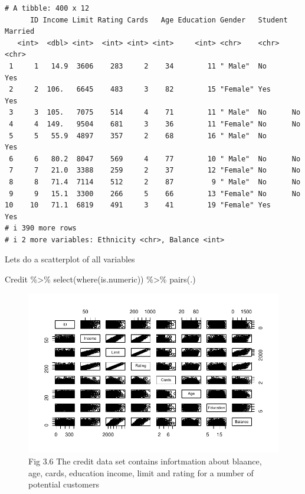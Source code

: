 \documentclass[
  letterpaper,
  DIV=11,
  numbers=noendperiod]{scrreprt}
\newenvironment{Shaded}{\begin{snugshade}}{\end{snugshade}}
\newcommand{\FunctionTok}[1]{\textcolor[rgb]{0.02,0.16,0.49}{#1}}
\newcommand{\NormalTok}[1]{\textcolor[rgb]{0.33,0.33,0.33}{#1}}
\newcommand{\SpecialCharTok}[1]{\textcolor[rgb]{0.00,0.46,0.62}{#1}}
\begin{document}
\begin{verbatim}
# A tibble: 400 x 12
      ID Income Limit Rating Cards   Age Education Gender   Student Married
   <int>  <dbl> <int>  <int> <int> <int>     <int> <chr>    <chr>   <chr>  
 1     1   14.9  3606    283     2    34        11 " Male"  No      Yes    
 2     2  106.   6645    483     3    82        15 "Female" Yes     Yes    
 3     3  105.   7075    514     4    71        11 " Male"  No      No     
 4     4  149.   9504    681     3    36        11 "Female" No      No     
 5     5   55.9  4897    357     2    68        16 " Male"  No      Yes    
 6     6   80.2  8047    569     4    77        10 " Male"  No      No     
 7     7   21.0  3388    259     2    37        12 "Female" No      No     
 8     8   71.4  7114    512     2    87         9 " Male"  No      No     
 9     9   15.1  3300    266     5    66        13 "Female" No      No     
10    10   71.1  6819    491     3    41        19 "Female" Yes     Yes    
# i 390 more rows
# i 2 more variables: Ethnicity <chr>, Balance <int>
\end{verbatim}

Lets do a scatterplot of all variables

\begin{Shaded}
\begin{Highlighting}[]
\NormalTok{Credit }\SpecialCharTok{\%\textgreater{}\%} \FunctionTok{select}\NormalTok{(}\FunctionTok{where}\NormalTok{(is.numeric)) }\SpecialCharTok{\%\textgreater{}\%} \FunctionTok{pairs}\NormalTok{(.)}
\end{Highlighting}
\end{Shaded}

\begin{figure}[H]

{\centering \includegraphics{Chapter3_files/figure-pdf/unnamed-chunk-70-1.pdf}

}

\caption{Fig 3.6 The credit data set contains infortmation about
blaance, age, cards, education income, limit and rating for a number of
potential customers}

\end{figure}
\end{document}
